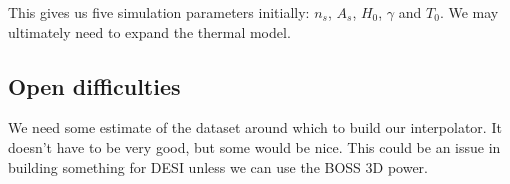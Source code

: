 \documentclass[10pt, aps, prd]{revtex4-1}
\begin{document}
This gives us five simulation parameters initially: $n_s$, $A_s$, $H_0$, $\gamma$ and $T_0$. We may ultimately need to expand the thermal model.

\subsection{Open difficulties}

We need some estimate of the dataset around which to build our interpolator. It doesn't have to be very good, but some would be nice. This could
be an issue in building something for DESI unless we can use the BOSS 3D power.



\end{document}
